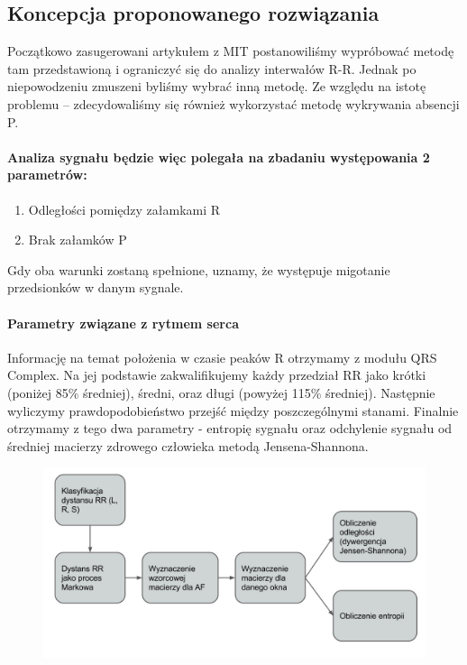 \subsection{Koncepcja proponowanego rozwiązania}
Początkowo zasugerowani artykułem z MIT postanowiliśmy wypróbować metodę tam przedstawioną 
i ograniczyć się do analizy interwałów R-R. 
Jednak po niepowodzeniu zmuszeni byliśmy wybrać inną metodę. 
Ze względu na istotę problemu -- zdecydowaliśmy się również wykorzystać metodę wykrywania absencji P.
\paragraph{Analiza sygnału będzie więc polegała na zbadaniu występowania 2 parametrów:}
\begin{enumerate}
    \item Odległości pomiędzy załamkami R
    \item Brak załamków P
\end{enumerate}
Gdy oba warunki zostaną spełnione, uznamy, że występuje migotanie przedsionków w danym sygnale.

\paragraph{Parametry związane z rytmem serca}
Informację na temat położenia w czasie peaków R otrzymamy z modułu QRS Complex. 
Na jej podstawie zakwalifikujemy każdy przedział RR jako krótki (poniżej 85\% średniej), 
średni, oraz długi (powyżej 115\% średniej). 
Następnie wyliczymy prawdopodobieństwo przejść między poszczególnymi stanami. 
Finalnie otrzymamy z tego dwa parametry - 
entropię sygnału oraz odchylenie sygnału od średniej macierzy zdrowego człowieka metodą Jensena-Shannona.
\begin{figure}[ht]
\centering
\includegraphics[width=12cm]{ATRIAL_FIBR/img/RRMethodFlow.jpg}
\end{figure}

